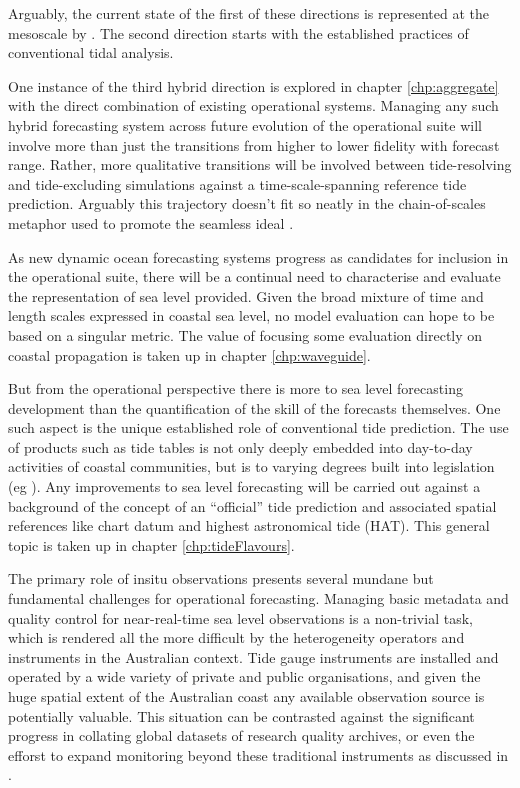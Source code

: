 Arguably, the current state of the first of these directions is represented at the mesoscale by \BL{}.   The second direction starts with the established practices of conventional tidal analysis.

One instance of the third hybrid direction is explored in chapter \ref{chp:aggregate} with the direct combination of existing operational systems.
Managing any such hybrid forecasting system across future evolution of the operational suite will involve more than just the transitions from higher to lower fidelity with forecast range.  Rather, more qualitative transitions will be involved between tide-resolving and tide-excluding simulations against a time-scale-spanning reference tide prediction.  Arguably this trajectory doesn't fit so neatly in the chain-of-scales metaphor used to promote the seamless ideal \cite{10.1175/bams-87-9-1195}.


As new dynamic ocean forecasting systems progress as candidates for inclusion in the operational suite, there will be a continual need to characterise and evaluate the representation of sea level provided.  Given the broad mixture of time and length scales expressed in coastal sea level, no model evaluation can hope to be based on a singular metric.    The value of focusing some evaluation directly on coastal propagation is taken up in chapter \ref{chp:waveguide}.



But from the operational perspective there is more to sea level forecasting development than the quantification of the skill of the forecasts themselves.
One such aspect is the unique established role of conventional tide prediction.   The use of products such as tide tables is not only deeply embedded into day-to-day activities of coastal communities, but is to varying degrees built into legislation (eg \citep{AusNavAct2012}).   Any improvements to sea level forecasting will be carried out against a background of the concept of an ``official'' tide prediction and associated spatial references like chart datum and highest astronomical tide (HAT).    
This general topic is taken up in chapter \ref{chp:tideFlavours}.


The primary role of insitu observations presents several mundane but fundamental challenges for operational forecasting.
Managing basic metadata and quality control for near-real-time sea level observations is a non-trivial task, which is rendered all the more difficult by the heterogeneity operators and instruments in the Australian context.    Tide gauge instruments are installed and operated by a wide variety of private and public organisations, and given the huge spatial extent of the Australian coast any available observation source is potentially valuable. 
This situation can be contrasted against the significant progress in collating global datasets of research quality archives, or even the efforst to expand monitoring beyond these traditional instruments as discussed in \citet{10.3389/fmars.2019.00348}.



